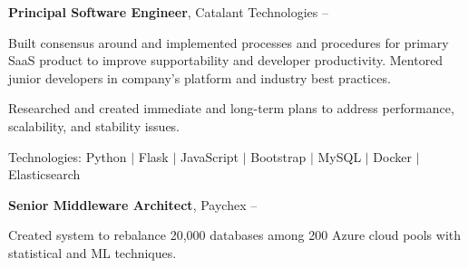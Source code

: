 \documentclass[MMMMyyyy,nonstopmode]{simpleresumecv_stacked}
\newcommand{\tech}[1]{\Gap\textrm{Technologies:} #1}
\newif\ifLOCATION
\begin{document}
\begin{Body}
\BigGap

\Entry
\textbf{Principal Software Engineer}, Catalant Technologies
\hfill
 -- 

\ifLOCATION
\hfill
Rochester, New York
\fi

\Gap

\begin{Detail}
Built consensus around and implemented processes and procedures for primary SaaS product to improve supportability and developer productivity.
Mentored junior developers in company's platform and industry best practices.

\Gap
\BulletItem
Researched and created immediate and long-term plans to address performance, scalability, and stability issues.

\tech{Python $|$ Flask $|$ JavaScript $|$ Bootstrap $|$ MySQL $|$ Docker $|$ Elasticsearch}

\end{Detail}

\BigGap


\Entry
\textbf{Senior Middleware Architect}, Paychex
\hfill
{} -- 

\ifLOCATION
\hfill
Rochester, New York
\fi

\Gap
\begin{Detail}
\iffalse
At Paychex I worked with multiple cross-functional teams to build: an inventory system to track hosts, JVMs, and databases; machine learning systems in Python to efficiently rebalance databases and predict system utilization; custom Chaos Monkey ro randomly terminate process to find configuration weaknesses; and implemented AppDynamics on over 20,000 JVMs.
\fi

\iftrue
\BulletItem
Created system to rebalance 20,000 databases among 200 Azure cloud pools with statistical and ML techniques.


\end{Detail}
\end{Body}
\end{document}
